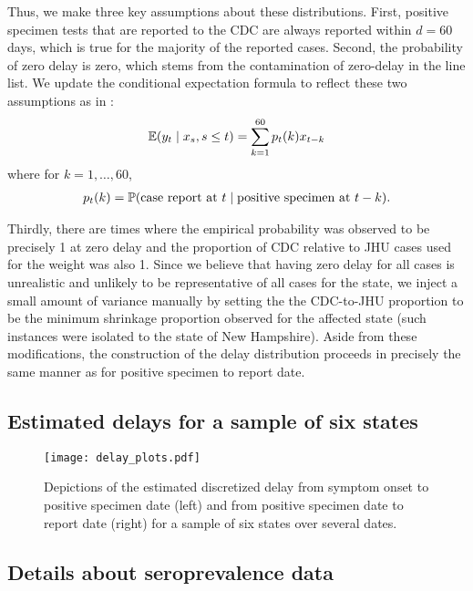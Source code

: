 Thus, we make three key assumptions about these distributions. First, positive
specimen tests that are reported to the CDC are always reported within $d = 60$
days, which is true for the majority of the reported cases. Second, the
probability of zero delay is zero, which stems from the contamination of
zero-delay in the line list. We update the
conditional expectation formula to reflect these two assumptions as in \citep{jahja2022real}: 
\begin{align*}
\E(y_t \mid x_s, s \leq t) = \sum_{k=1}^{60} p_t(k) x_{t-k}
\end{align*}
where for $k = 1, \dots, 60$,
\begin{align*}
p_t(k) = \P(\text{case report at }t \mid \text{positive specimen at }t-k).
\end{align*}


Thirdly, there are times where the empirical probability
was observed to be precisely 1 at zero delay and the proportion of CDC relative
to JHU cases used for the weight was also 1. Since we believe that having zero
delay for all cases is unrealistic and unlikely to be representative of all
cases for the state, we inject a small amount of variance manually by setting
the the CDC-to-JHU proportion to be the minimum shrinkage proportion observed
for the affected state (such instances were isolated to the state of New
Hampshire). Aside from these modifications, the construction of the delay
distribution proceeds in precisely the same manner as for positive specimen to
report date. 

\subsection{Estimated delays for a sample of six states}
\label{supp:est-delays-samp}

\begin{figure}[H]
\centering
    \texttt{[image: delay\_plots.pdf]} 
    \caption{Depictions of the estimated discretized delay from symptom onset to 
    positive specimen date (left) and from positive specimen date to report date (right)
    for a sample of six states over several dates.}
    \label{fig:delay-plots-samp}
\end{figure}

\subsection{Details about seroprevalence data}
\label{supp:sero-details}

